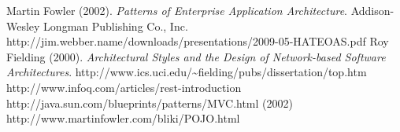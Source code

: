 \begin{thebibliography}{30}
 Martin Fowler (2002). \textit{Patterns of Enterprise Application Architecture}.  Addison-Wesley Longman Publishing Co., Inc.
 http://jim.webber.name/downloads/presentations/2009-05-HATEOAS.pdf
 Roy Fielding (2000). \textit{Architectural Styles and the Design of Network-based Software Architectures}. http://www.ics.uci.edu/\~{}fielding/pubs/dissertation/top.htm
 http://www.infoq.com/articles/rest-introduction
 http://java.sun.com/blueprints/patterns/MVC.html (2002)
 http://www.martinfowler.com/bliki/POJO.html
\end{thebibliography}
